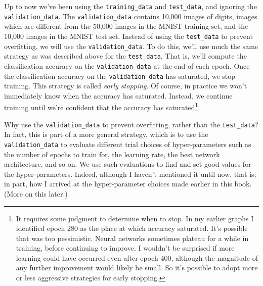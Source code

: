Up to now we've been using the \lstinline{training_data} and \lstinline{test_data}, and ignoring the \lstinline{validation_data}. The \lstinline{validation_data} contains 10,000 images of digits, images which are different from the 50,000 images in the MNIST training set, and the 10,000 images in the MNIST test set. Instead of using the \lstinline{test_data} to prevent overfitting, we will use the \lstinline{validation_data}. To do this, we'll use much the same strategy as was described above for the \lstinline{test_data}. That is, we'll compute the classification accuracy on the \lstinline{validation_data} at the end of each epoch. Once the classification accuracy on the \lstinline{validation_data} has saturated, we stop training. This strategy is called \textit{early stopping}. Of course, in practice we won't immediately know when the accuracy has saturated. Instead, we continue training until we're confident that the accuracy has saturated\footnote{It requires some judgment to determine when to stop. In my earlier graphs I identified epoch 280 as the place at which accuracy saturated. It's possible that was too pessimistic. Neural networks sometimes plateau for a while in training, before continuing to improve. I wouldn't be surprised if more learning could have occurred even after epoch 400, although the magnitude of any further improvement would likely be small. So it's possible to adopt more or less aggressive strategies for early stopping.}.


Why use the \lstinline{validation_data} to prevent overfitting, rather than the \lstinline{test_data}? In fact, this is part of a more general strategy, which is to use the \lstinline{validation_data} to evaluate different trial choices of hyper-parameters such as the number of epochs to train for, the learning rate, the best network architecture, and so on. We use such evaluations to find and set good values for the hyper-parameters. Indeed, although I haven't mentioned it until now, that is, in part, how I arrived at the hyper-parameter choices made earlier in this book. (More on this later.)


